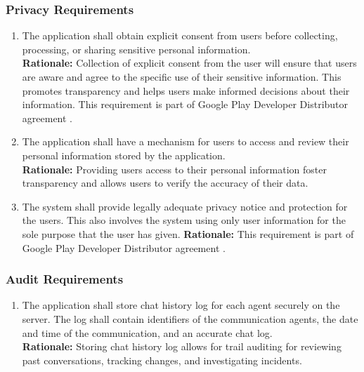 \documentclass[]{article}
\begin{document}
\subsubsection{Privacy Requirements}
\label{ssub:privacy_requirements}
\begin{enumerate}[{SR-P}1. ]
	\item The application shall obtain explicit consent from users before collecting, processing, or sharing sensitive personal information. \\
	{\bf Rationale:} Collection of explicit consent from the user will ensure that users are aware and agree to the specific use of their sensitive information. 
	This promotes transparency and helps users make informed decisions about their information. This requirement is part of Google Play Developer
	Distributor agreement \cite{9c}.
	\item The application shall have a mechanism for users to access and review their personal information stored by the application. \\
	{\bf Rationale:} Providing users access to their personal information foster transparency and allows users to verify the accuracy of their data.
	\item The system shall provide legally adequate privacy notice and protection for the users. This also involves the system using only
	user information for the sole purpose that the user has given.
	{\bf Rationale:} This requirement is part of Google Play Developer Distributor agreement \cite{9c}.
\end{enumerate}

\subsubsection{Audit Requirements}
\label{ssub:audit_requirements}
\begin{enumerate}[{SR-AU}1. ]
	\item The application shall store chat history log for each agent securely on the server. The log shall contain 
	identifiers of the communication agents, the date and time of the communication, and an accurate chat log. \\
	{\bf Rationale:} Storing chat history log allows for trail auditing for reviewing past conversations, tracking changes, 
	and investigating incidents.
\end{enumerate}
\end{document}
